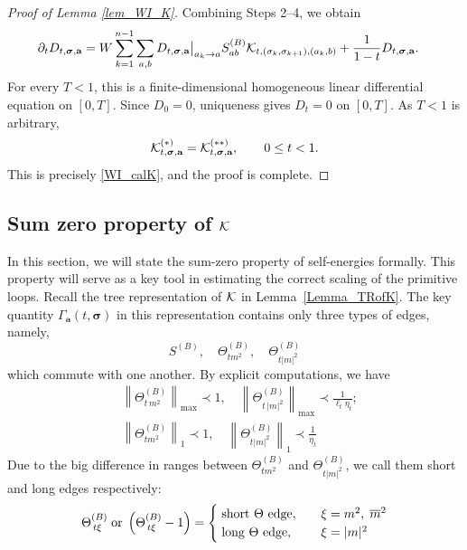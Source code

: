 \documentclass[10pt,reqno]{article}
\theoremstyle{plain} %
\theoremstyle{remark}
\numberwithin{equation}{section}
\begin{document}
\begin{proof}[Proof of Lemma \ref{lem_WI_K}]
\medskip
{}

Combining Steps 2--4, we obtain
\begin{align*}
 \partial_tD_{t,\boldsymbol{\sigma},\textbf{a}}
 &=W\sum_{k=1}^{n-1}\sum_{a,b}
 D_{t,\boldsymbol{\sigma},\textbf{a}}\big|_{a_k\to a}
 S^{(B)}_{ab}{\cal K}_{t,(\sigma_k,\sigma_{k+1}),(a_k,b)}            +\frac{1}{1-t}D_{t,\boldsymbol{\sigma},\textbf{a}}.
\end{align*}
For every $T<1$, this is a finite-dimensional homogeneous linear
differential equation on $[0,T]$. Since $D_0=0$, uniqueness gives
$D_t=0$ on $[0,T]$. As $T<1$ is arbitrary,
\[
 {\cal K}^{(*)}_{t,\boldsymbol{\sigma},\textbf{a}}={\cal K}^{(**)}_{t,\boldsymbol{\sigma},\textbf{a}},
 \qquad 0\leq t<1.
\]
This is precisely \eqref{WI_calK}, and the proof is complete.
\end{proof}


\bigskip


 
\subsection{Sum zero property of \texorpdfstring{$\cal K$}{K}}

  In this section, we will state the sum-zero property of self-energies formally. This property will serve as a key tool in estimating the correct scaling of the primitive loops.  Recall the tree representation of  $\cal K$ in  Lemma~\ref{Lemma_TRofK}. 
The key quantity $\Gamma_{ \textbf{a}}(t, \boldsymbol{\sigma})$ in this representation contains only three types of edges, namely,  %
$$
S^{(B)},\quad \Theta^{(B)}_{tm^2}, \quad \Theta^{(B)}_{t|m|^2}
$$
which  commute with one another. By explicit computations, we have 
 \begin{align}
     & \left\|\Theta^{(B)}_{t\,m^2}\right\|_{\max} \prec 1, \quad \left\|\Theta^{(B)}_{t\,|m|^2}\right\|_{\max}\prec \frac{1}{\ell_t\eta_t}; \\ 
   & \left\|\Theta^{(B)}_{tm^2}\right\|_{1} \prec 1, \quad \left\|\Theta^{(B)}_{t|m|^2}\right\|_1\prec \frac{1}{\eta_t}
 \end{align}
Due to the big difference in ranges  between $\Theta^{(B)}_{tm^2}$ and $\Theta^{(B)}_{t|m|^2}$, we  call them short and long edges respectively:
$$
\Theta^{(B)}_{\,t\xi} \; \hbox{or} \; \left(\Theta^{(B)}_{\,t\xi}-1\right)=\begin{cases}
   \;  \hbox{short $\Theta$ edge}, \quad &\xi=m^2, \; \overline m^2
     \\
     \;\hbox{long $\Theta$ edge}, \quad &\xi=|m|^2 
\end{cases}
$$
\end{document}
